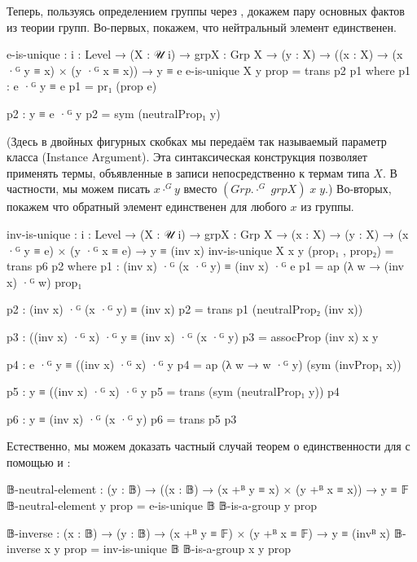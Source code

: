 \documentclass{article}[12pt]
\begin{document}
Теперь, пользуясь определением группы через , докажем пару основных фактов
из теории групп. Во-первых, покажем, что нейтральный элемент единственен.
\begin{code}
e-is-unique : {i : Level} → (X : 𝒰 i) → {{grpX : Grp X}} 
              → (y : X) 
              → ((x : X) → (x ·ᴳ y ≡ x) × (y ·ᴳ x ≡ x))
              → y ≡ e
e-is-unique X y prop = trans p2 p1
    where
        p1 : e ·ᴳ y ≡ e
        p1 = pr₁ (prop e)

        p2 : y ≡ e ·ᴳ y
        p2 = sym (neutralProp₁ y)
\end{code}
(Здесь в двойных фигурных скобках мы передаём так называемый параметр класса (Instance Argument).
Эта синтаксическая конструкция позволяет применять термы, объявленные в записи 
непосредственно к термам типа $X$. В частности, мы можем писать $x \cdot^G y$ вместо
$(Grp.\cdot^G \; grpX) \; x \; y$.) Во-вторых, покажем что обратный элемент единственен для любого
$x$ из группы.
\begin{code}
inv-is-unique : {i : Level} → (X : 𝒰 i) → {{grpX : Grp X}} 
                → (x : X)
                → (y : X) 
                → (x ·ᴳ y ≡ e) × (y ·ᴳ x ≡ e)
                → y ≡ (inv x)
inv-is-unique X x y (prop₁ , prop₂) = trans p6 p2
    where
        p1 : (inv x) ·ᴳ (x ·ᴳ y) ≡ (inv x) ·ᴳ e
        p1 = ap (λ w → (inv x) ·ᴳ w) prop₁

        p2 : (inv x) ·ᴳ (x ·ᴳ y) ≡ (inv x)
        p2 = trans p1 (neutralProp₂ (inv x))

        p3 : ((inv x) ·ᴳ x) ·ᴳ y ≡ (inv x) ·ᴳ (x ·ᴳ y)
        p3 = assocProp (inv x) x y

        p4 : e ·ᴳ y ≡ ((inv x) ·ᴳ x) ·ᴳ y
        p4 = ap (λ w → w ·ᴳ y) (sym (invProp₁ x))

        p5 : y ≡ ((inv x) ·ᴳ x) ·ᴳ y
        p5 = trans (sym (neutralProp₁ y)) p4

        p6 : y ≡ (inv x) ·ᴳ (x ·ᴳ y)
        p6 = trans p5 p3
\end{code}

Естественно, мы можем доказать частный случай теорем о единственности для  с помощью
 и :
\begin{code}
𝔹-neutral-element : (y : 𝔹) → ((x : 𝔹) → (x +ᴮ y ≡ x) × (y +ᴮ x ≡ x))
                    → y ≡ 𝔽
𝔹-neutral-element y prop = e-is-unique 𝔹 {{𝔹-is-a-group}} y prop

𝔹-inverse : (x : 𝔹) → (y : 𝔹)
            → (x +ᴮ y ≡ 𝔽) × (y +ᴮ x ≡ 𝔽)
            → y ≡ (invᴮ x)
𝔹-inverse x y prop = inv-is-unique 𝔹 {{𝔹-is-a-group}} x y prop
\end{code}
\end{document}
